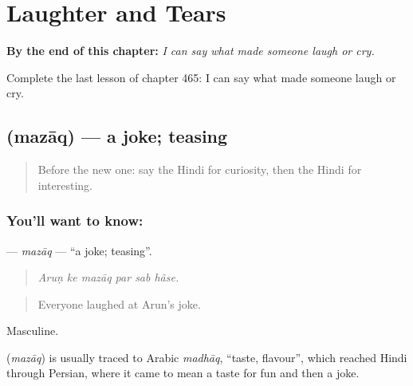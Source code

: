 
\chapter{Laughter and Tears}
\label{ch:hi-laughter-and-tears}

\begin{chapteropening}
\textbf{By the end of this chapter:} \emph{I can say what made someone laugh or cry.}

Complete the last lesson of chapter 465: I can say what made someone laugh or cry.
\end{chapteropening}

\section[\texorpdfstring{\hi{मज़ाक़} (mazāq)}{मज़ाक़ (mazāq)}]{ (mazāq) — a joke; teasing}

\label{lesson:HI-C465-mazaq}



\begin{quote}
Before the new one: say the Hindi for curiosity, then the Hindi for interesting.
\end{quote}

\subsection*{You'll want to know: }
\textbf{} — \emph{mazāq} — \textquotedblleft{}a joke; teasing\textquotedblright{}.

\begin{quote}
     
\end{quote}

\begin{quote}
\emph{Aruṇ ke mazāq par sab hãse.}
\end{quote}

\begin{quote}
Everyone laughed at Arun's joke.
\end{quote}

Masculine.

\begin{cousinweb}
\textbf{} (\emph{mazāq}) is usually traced to Arabic \emph{madhāq}, \textquotedblleft{}taste, flavour\textquotedblright{}, which reached Hindi through Persian, where it came to mean a taste for fun and then a joke.
\end{cousinweb}

